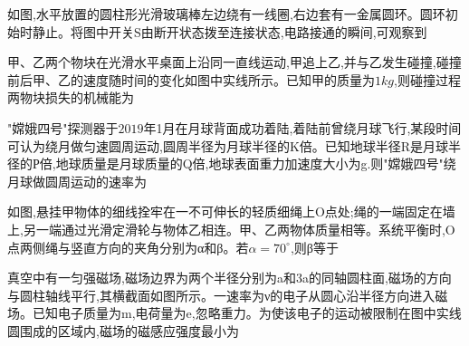 \question[6]如图,水平放置的圆柱形光滑玻璃棒左边绕有一线圈,右边套有一金属圆环。圆环初始时静止。将图中开关S由断开状态拨至连接状态,电路接通的瞬间,可观察到
\begin{solution}{4cm}

\end{solution}



\question[6]甲、乙两个物块在光滑水平桌面上沿同一直线运动,甲追上乙,并与乙发生碰撞,碰撞前后甲、乙的速度随时间的变化如图中实线所示。已知甲的质量为$1kg$,则碰撞过程两物块损失的机械能为
\begin{solution}{4cm}

\end{solution}



\question[6]"嫦娥四号"探测器于$2019$年1月在月球背面成功着陆,着陆前曾绕月球飞行,某段时间可认为绕月做匀速圆周运动,圆周半径为月球半径的K倍。已知地球半径R是月球半径的Р倍,地球质量是月球质量的Q倍,地球表面重力加速度大小为g.则"嫦娥四号"绕月球做圆周运动的速率为
\begin{solution}{4cm}

\end{solution}



\question[6]如图,悬挂甲物体的细线拴牢在一不可伸长的轻质细绳上O点处;绳的一端固定在墙上,另一端通过光滑定滑轮与物体乙相连。甲、乙两物体质量相等。系统平衡时,O点两侧绳与竖直方向的夹角分别为α和β。若$α=70^∘$,则β等于
\begin{solution}{4cm}

\end{solution}



\question[6]真空中有一匀强磁场,磁场边界为两个半径分别为a和3a的同轴圆柱面,磁场的方向与圆柱轴线平行,其横截面如图所示。一速率为ν的电子从圆心沿半径方向进入磁场。已知电子质量为m,电荷量为e,忽略重力。为使该电子的运动被限制在图中实线圆围成的区域内,磁场的磁感应强度最小为
\begin{solution}{4cm}

\end{solution}



